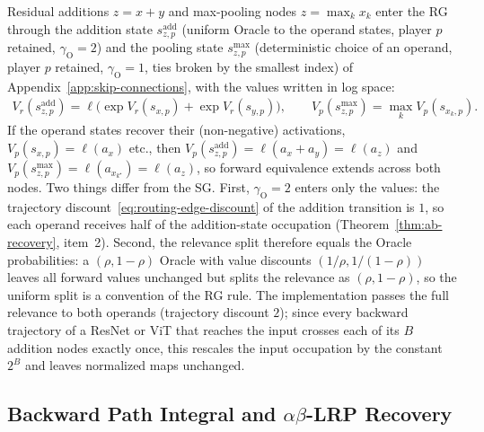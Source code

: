 \documentclass[twoside]{article}
\newcommand{\1}{\mathbf{1}}
\begin{document}
Residual additions $z = x + y$ and max-pooling nodes $z = \max_k x_k$ enter the \ac{RG} through the
addition state $s^{\mathrm{add}}_{z,p}$ (uniform Oracle to the operand states, player $p$ retained,
$\gamma_{\mathrm{O}} = 2$) and the pooling state $s^{\max}_{z,p}$ (deterministic choice of an
operand, player $p$ retained, $\gamma_{\mathrm{O}} = 1$, ties broken by the smallest index) of
Appendix~\ref{app:skip-connections}, with the values written in log space:
\begin{align}\label{eq:routing-add-max}
    V_r(s^{\mathrm{add}}_{z,p}) = \ell\bigl(\exp V_r(s_{x,p}) + \exp V_r(s_{y,p})\bigr),
    \qquad
    V_p(s^{\max}_{z,p}) = \max_k V_p(s_{x_k,p}).
\end{align}
If the operand states recover their (non-negative) activations, $V_p(s_{x,p}) = \ell(a_x)$ etc.,
then $V_p(s^{\mathrm{add}}_{z,p}) = \ell(a_x + a_y) = \ell(a_z)$ and $V_p(s^{\max}_{z,p}) =
    \ell(a_{x_{k^\star}}) = \ell(a_z)$, so forward equivalence extends across both nodes. Two things
differ from the \ac{SG}. First, $\gamma_{\mathrm{O}} = 2$ enters only the values: the trajectory
discount~\eqref{eq:routing-edge-discount} of the addition transition is $1$, so each operand
receives half of the addition-state occupation (Theorem~\ref{thm:ab-recovery}, item~2). Second, the
relevance split therefore equals the Oracle probabilities: a $(\rho, 1-\rho)$ Oracle with value
discounts $(1/\rho, 1/(1-\rho))$ leaves all forward values unchanged but splits the relevance as
$(\rho, 1-\rho)$, so the uniform split is a convention of the \ac{RG} rule. The implementation
passes the full relevance to both operands (trajectory discount $2$); since every backward
trajectory of a ResNet or \ac{ViT} that reaches the input crosses each of its $B$ addition nodes
exactly once, this rescales the input occupation by the constant $2^B$ and leaves normalized maps
unchanged.

\subsection{Backward Path Integral and \texorpdfstring{$\alpha\beta$-\ac{LRP} Recovery}{alpha-beta LRP Recovery}}\label{app:routing-attribution}
\end{document}
